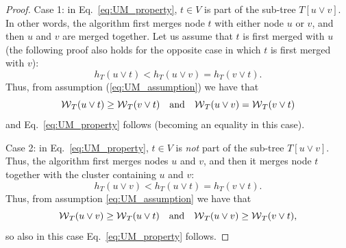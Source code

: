 \begin{proof}
Case 1: in Eq.~\ref{eq:UM_property}, $t\in V$ is part of the sub-tree ${T[u \vee v]}$. In other words, the algorithm first merges node $t$ with either node $u$ or $v$, and then $u$ and $v$ are merged together. Let us assume that $t$ is first merged with $u$ (the following proof also holds for the opposite case in which $t$ is first merged with $v$):
\begin{equation}
h_T(u \vee t) < h_T(u \vee v) = h_T(v \vee t).
\end{equation}
Thus, from assumption (\ref{eq:UM_assumption}) we have that
\begin{equation}
\mathcal{W}{}_{T}(u \vee t) \geq \mathcal{W}{}_{T}(v \vee t) \quad  \text{and} \quad \mathcal{W}{}_{T}(u \vee v) = \mathcal{W}{}_{T}(v \vee t)
\end{equation}
and Eq.~\ref{eq:UM_property} follows (becoming an equality in this case).

Case 2: in Eq.~\ref{eq:UM_property}, $t\in V$ is \emph{not} part of the sub-tree ${T[u \vee v]}$. Thus, the algorithm first merges nodes $u$ and $v$, and then it merges node $t$ together with the cluster containing $u$ and $v$:
\begin{equation}
h_T(u \vee v) < h_T(u \vee t) = h_T(v \vee t).
\end{equation}
Thus, from assumption \ref{eq:UM_assumption} we have that
\begin{equation}
\mathcal{W}{}_{T}(u \vee v) \geq \mathcal{W}{}_{T}(u \vee t) \quad  \text{and} \quad \mathcal{W}{}_{T}(u \vee v) \geq \mathcal{W}{}_{T}(v \vee t),
\end{equation}
so also in this case Eq.~\ref{eq:UM_property} follows.


\end{proof}
